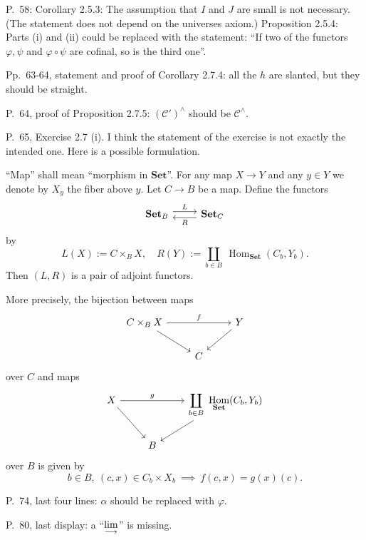 \documentclass[12pt]{article}
\theoremstyle{remark}
\theoremstyle{definition}
\newcommand{\C}{\mathcal C}
\newcommand{\Set}{\mathbf{Set}}
\newcommand{\colim}{\operatornamewithlimits{\underset{\longrightarrow}{lim}}}
\DeclareMathOperator{\Hom}{Hom}%
\begin{document}

\noindent P.~58: Corollary 2.5.3: The assumption that $I$ and $J$ are small is not necessary. (The statement does not depend on the universes axiom.) Proposition 2.5.4: Parts (i) and (ii) could be replaced with the statement: ``If two of the functors $\varphi,\psi$ and $\varphi\circ\psi$ are cofinal, so is the third one''.

\noindent Pp.~63-64, statement and proof of Corollary 2.7.4: all the $h$ are slanted, but they should be straight.

\noindent P.~64, proof of Proposition 2.7.5: $(\C')^\wedge$ should be $\C^\wedge$. 

\noindent P.~65, Exercise 2.7 (i). I think the statement of the exercise is not exactly the intended one. Here is a possible formulation. 

``Map'' shall mean ``morphism in $\Set$''. For any map $X\to Y$ and any $y\in Y$ we denote by $X_y$ the fiber above $y$. Let $C\to B$ be a map. Define the functors 
$$
\begin{tikzcd}
\Set_B\ar[yshift=.7ex]{r}{L}&\Set_C\ar[yshift=-.7ex]{l}{R}
\end{tikzcd}
$$ 
by 
$$
L(X):=C\times_BX,\quad R(Y):=\coprod_{b\in B}\ \Hom_{\Set}(C_b,Y_b). 
$$ 
Then $(L,R)$ is a pair of adjoint functors.

More precisely, the bijection between maps
$$
\begin{tikzcd}
C\times_BX\ar{dr}\ar{rr}{f}&&Y\ar{dl}\\ 
{}&C
\end{tikzcd}
$$
over $C$ and maps
$$
\begin{tikzcd}
X\ar{dr}\ar{rr}{g}&&\displaystyle\coprod_{b\in B}\ \Hom_{\Set}(C_b,Y_b)\ar{dl}\\ 
{}&B
\end{tikzcd}
$$
over $B$ is given by 
$$
b\in B,\ (c,x)\in C_b\times X_b\ \implies\ f(c,x)=g(x)(c).
$$

\noindent P.~74, last four lines: $\alpha$ should be replaced with $\varphi$. 

\noindent P.~80, last display: a ``$\displaystyle\colim$'' is missing.
\end{document}
